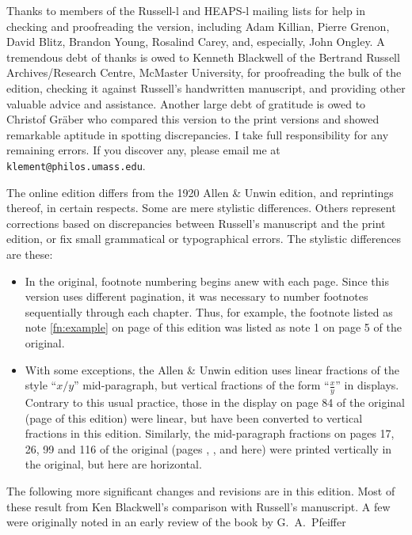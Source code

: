 Thanks to members of the Russell-l and HEAPS-l mailing lists for help in checking and
proofreading the version, including Adam Killian, Pierre Grenon, David Blitz, 
Brandon Young, Rosalind Car\-ey,
and, especially, John Ongley. A tremendous debt of thanks is owed to
Kenneth Blackwell of the Bertrand Russell Ar\-chives/Re\-search Centre, McMaster University, for 
proofreading the bulk of the edition, checking it against 
Russell's handwritten man\-u\-script, and providing other valuable advice and assistance. Another large debt of gratitude is owed to Christof Gr{\"a}ber who compared this version to the print versions and showed remarkable aptitude in spotting discrepancies. I take full responsibility for any
remaining errors. If you discover any, 
please email me at \texttt{klement@philos.umass.edu}.

The online edition differs from the 1920 Allen \& Unwin edition, and
reprintings thereof, in certain respects. Some are mere stylistic differences. Others represent corrections based on
discrepancies between Russell's manu\-script and the print edition, or 
fix small grammatical or typ\-o\-graph\-i\-cal errors. The stylistic differences are
these:
\begin{itemize}
 \item In the original, footnote numbering begins anew with each page. Since
this version uses different pagination, it was necessary to number footnotes
sequentially through each chapter. Thus, for example, the footnote listed as
note \ref{fn:example} on page \pageref{fn:example} of this edition was listed
as note 1 on page 5 of the original.
\item With some exceptions, the Allen \& Unwin edition uses linear fractions of the style
``$x/y$'' mid-paragraph, but vertical fractions of the form ``$\tfrac{x}{y}$'' in displays. 
Contrary to this usual practice, those
in the display on page 84 of the original (page \pageref{page84display} of
this edition) were linear, but have been converted to vertical fractions
in this edition. Similarly, the mid-paragraph fractions on pages 17, 26, 99 and 116 of the original (pages \pageref{fracchange17}, \pageref{fracchange26}, \pageref{parfraction1} and \pageref{parfraction2} here) were printed vertically in the original, but here are horizontal.
\end{itemize}
\noindent The following more significant changes and revisions are  in this
edition. Most of these result from Ken Blackwell's comparison with Russell's
manuscript. A few were originally noted in an early review of the book by G.\ A.\ Pfeiffer

